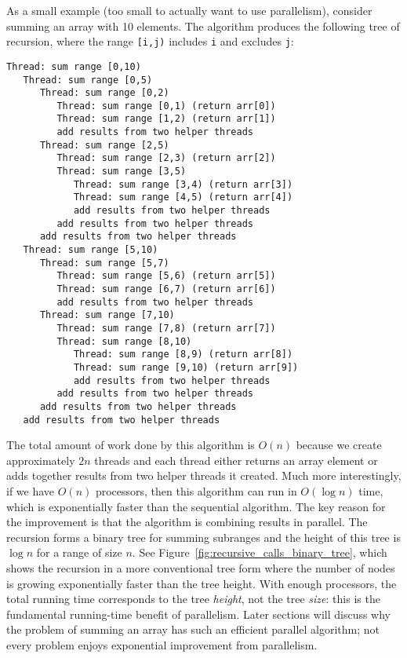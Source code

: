 \documentclass[10pt]{article}
\begin{document}
As a small example (too small to actually want to use parallelism),
consider summing an array with 10 elements.  The algorithm
produces the following tree of recursion, where the range {\tt [i,j)}
includes {\tt i} and excludes {\tt j}:
\begin{verbatim}
Thread: sum range [0,10)
   Thread: sum range [0,5)
      Thread: sum range [0,2) 
         Thread: sum range [0,1) (return arr[0])
         Thread: sum range [1,2) (return arr[1])
         add results from two helper threads
      Thread: sum range [2,5)
         Thread: sum range [2,3) (return arr[2])
         Thread: sum range [3,5) 
            Thread: sum range [3,4) (return arr[3])
            Thread: sum range [4,5) (return arr[4])
            add results from two helper threads
         add results from two helper threads
      add results from two helper threads
   Thread: sum range [5,10)
      Thread: sum range [5,7)
         Thread: sum range [5,6) (return arr[5])
         Thread: sum range [6,7) (return arr[6])
         add results from two helper threads
      Thread: sum range [7,10)
         Thread: sum range [7,8) (return arr[7])
         Thread: sum range [8,10) 
            Thread: sum range [8,9) (return arr[8])
            Thread: sum range [9,10) (return arr[9])
            add results from two helper threads
         add results from two helper threads
      add results from two helper threads
   add results from two helper threads
\end{verbatim}
The total amount of work done by this algorithm is $O(n)$ because we
create approximately $2n$ threads and each thread either returns an
array element or adds together results from two helper threads it
created.  Much more interestingly, if we have $O(n)$ processors, then
this algorithm can run in $O(\log n)$ time, which is exponentially
faster than the sequential algorithm.  The key reason for the
improvement is that the algorithm is combining results in parallel.
The recursion forms a binary tree for summing subranges and the height
of this tree is $\log n$ for a range of size $n$.  See
Figure~\ref{fig:recursive_calls_binary_tree}, which shows the recursion in
a more conventional tree form where the number of nodes is growing
exponentially faster than the tree height.
With enough processors, the total running time corresponds to the 
tree \emph{height}, not the tree \emph{size}: this is the fundamental 
running-time benefit of parallelism.  Later sections will discuss why 
the problem of summing an array has such an efficient parallel algorithm; 
not every problem enjoys exponential improvement from parallelism.
\end{document}
